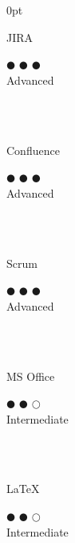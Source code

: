 \documentclass[a4paper]{article}
\begin{document}
\begin{adjustwidth}{\parindent}{0pt}
\begin{minipage}[t]{0.25\textwidth}
\begin{minipage}{0.65\textwidth}
  \small{JIRA}
\end{minipage}
\begin{minipage}{0.3\textwidth}
  \centering $\mdlgblkcircle$ $\mdlgblkcircle$ $\mdlgblkcircle$ \\  \footnotesize{Advanced}
\end{minipage} \\ \hspace{0pt} \\

\begin{minipage}{0.65\textwidth}
  \small{Confluence}
\end{minipage}
\begin{minipage}{0.3\textwidth}
  \centering $\mdlgblkcircle$ $\mdlgblkcircle$ $\mdlgblkcircle$ \\  \footnotesize{Advanced}
\end{minipage} \\ \hspace{0pt} \\

\begin{minipage}{0.65\textwidth}
  \small{Scrum}
\end{minipage}
\begin{minipage}{0.3\textwidth}
  \centering $\mdlgblkcircle$ $\mdlgblkcircle$ $\mdlgblkcircle$ \\  \footnotesize{Advanced}
\end{minipage} \\ \hspace{0pt} \\

 \begin{minipage}{0.65\textwidth}
  \small{MS Office}
\end{minipage}
\begin{minipage}{0.3\textwidth}
  \centering $\mdlgblkcircle$ $\mdlgblkcircle$ $\mdlgwhtcircle$ \\  \footnotesize{\mbox{Intermediate}}
\end{minipage} \\ \hspace{0pt} \\

\begin{minipage}{0.65\textwidth}
  \small{\LaTeX}
\end{minipage}
\begin{minipage}{0.3\textwidth}
  \centering $\mdlgblkcircle$ $\mdlgblkcircle$ $\mdlgwhtcircle$ \\  \footnotesize{\mbox{Intermediate}}
\end{minipage} \\ \hspace{0pt} \\
 

\end{minipage}
\end{adjustwidth}
\end{document}

